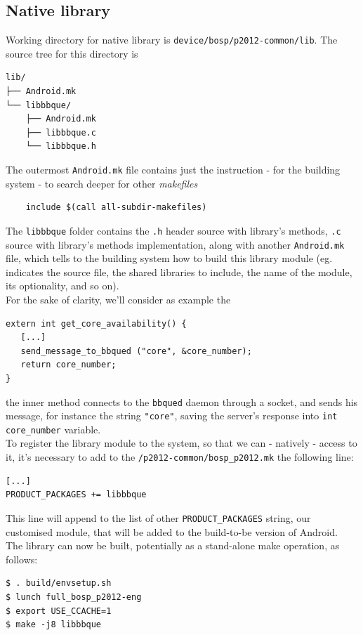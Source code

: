 \subsection{Native library}
Working directory for native library is \texttt{device/bosp/p2012-common/lib}.
The source tree for this directory is
\begin{verbatim}
lib/
├── Android.mk
└── libbbque/
    ├── Android.mk
    ├── libbbque.c
    └── libbbque.h
\end{verbatim}
The outermost \texttt{Android.mk} file contains just the instruction - for the building system - to search deeper for other \textit{makefiles}
\begin{verbatim}
	include $(call all-subdir-makefiles)
\end{verbatim}
The \texttt{libbbque} folder contains the \texttt{.h} header source with library's methods, \texttt{.c} source with library's methods implementation, along with another \texttt{Android.mk} file, which tells to the building system how to build this library module (eg. indicates the source file, the shared libraries to include, the name of the module, its optionality, and so on).\\
For the sake of clarity, we'll consider as example the
\begin{verbatim}
extern int get_core_availability() {
   [...]
   send_message_to_bbqued ("core", &core_number);
   return core_number;
}
\end{verbatim}
the inner method connects to the \texttt{bbqued} daemon through a socket, and sends his message, for instance the string \texttt{"core"}, saving the server's response into \texttt{int core\_number} variable.\\
To register the library module to the system, so that we can - natively - access to it, it's necessary to add to the \texttt{/p2012-common/bosp\_p2012.mk} the following line:
\begin{verbatim}
[...]
PRODUCT_PACKAGES += libbbque
\end{verbatim}
This line will append to the list of other \texttt{PRODUCT\_PACKAGES} string, our customised module, that will be added to the build-to-be version of Android.\\
The library can now be built, potentially as a stand-alone make operation, as follows:
\begin{verbatim}
$ . build/envsetup.sh
$ lunch full_bosp_p2012-eng
$ export USE_CCACHE=1
$ make -j8 libbbque
\end{verbatim}
